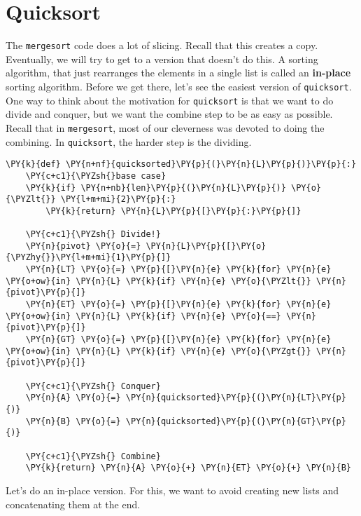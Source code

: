 \section{Quicksort}


The \texttt{mergesort} code does a lot of slicing.
Recall that this creates a copy.
Eventually, we will try to get to a version that doesn't do this.
A sorting algorithm, that just rearranges the elements in a single list is called an \textbf{in-place} sorting algorithm.
Before we get there, let's see the easiest version of \texttt{quicksort}.  One way to think about the motivation for \texttt{quicksort} is that we want to do divide and conquer, but we want the combine step to be as easy as possible.  Recall that in \texttt{mergesort}, most of our cleverness was devoted to doing the combining.
In \texttt{quicksort}, the harder step is the dividing.

\begin{Verbatim}[commandchars=\\\{\}]
\PY{k}{def} \PY{n+nf}{quicksorted}\PY{p}{(}\PY{n}{L}\PY{p}{)}\PY{p}{:}
    \PY{c+c1}{\PYZsh{}base case}
    \PY{k}{if} \PY{n+nb}{len}\PY{p}{(}\PY{n}{L}\PY{p}{)} \PY{o}{\PYZlt{}} \PY{l+m+mi}{2}\PY{p}{:}
        \PY{k}{return} \PY{n}{L}\PY{p}{[}\PY{p}{:}\PY{p}{]}

    \PY{c+c1}{\PYZsh{} Divide!}
    \PY{n}{pivot} \PY{o}{=} \PY{n}{L}\PY{p}{[}\PY{o}{\PYZhy{}}\PY{l+m+mi}{1}\PY{p}{]}
    \PY{n}{LT} \PY{o}{=} \PY{p}{[}\PY{n}{e} \PY{k}{for} \PY{n}{e} \PY{o+ow}{in} \PY{n}{L} \PY{k}{if} \PY{n}{e} \PY{o}{\PYZlt{}} \PY{n}{pivot}\PY{p}{]}
    \PY{n}{ET} \PY{o}{=} \PY{p}{[}\PY{n}{e} \PY{k}{for} \PY{n}{e} \PY{o+ow}{in} \PY{n}{L} \PY{k}{if} \PY{n}{e} \PY{o}{==} \PY{n}{pivot}\PY{p}{]}
    \PY{n}{GT} \PY{o}{=} \PY{p}{[}\PY{n}{e} \PY{k}{for} \PY{n}{e} \PY{o+ow}{in} \PY{n}{L} \PY{k}{if} \PY{n}{e} \PY{o}{\PYZgt{}} \PY{n}{pivot}\PY{p}{]}

    \PY{c+c1}{\PYZsh{} Conquer}
    \PY{n}{A} \PY{o}{=} \PY{n}{quicksorted}\PY{p}{(}\PY{n}{LT}\PY{p}{)}
    \PY{n}{B} \PY{o}{=} \PY{n}{quicksorted}\PY{p}{(}\PY{n}{GT}\PY{p}{)}

    \PY{c+c1}{\PYZsh{} Combine}
    \PY{k}{return} \PY{n}{A} \PY{o}{+} \PY{n}{ET} \PY{o}{+} \PY{n}{B}
\end{Verbatim}



Let's do an in-place version.  For this, we want to avoid creating new lists and concatenating them at the end.

